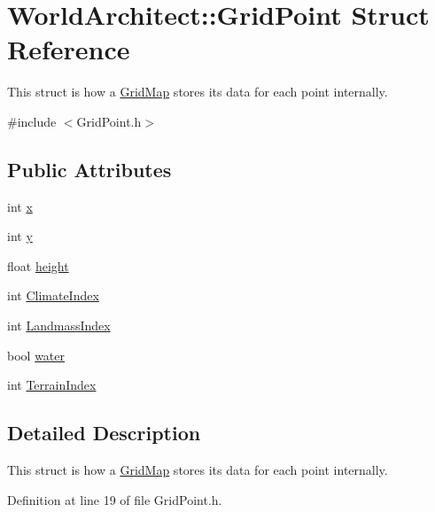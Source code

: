 \hypertarget{struct_world_architect_1_1_grid_point}{}\section{World\+Architect\+::Grid\+Point Struct Reference}
\label{struct_world_architect_1_1_grid_point}


This struct is how a \mbox{\hyperlink{class_world_architect_1_1_grid_map}{Grid\+Map}} stores its data for each point internally.  




{\ttfamily \#include $<$Grid\+Point.\+h$>$}

\subsection*{Public Attributes}
\begin{DoxyCompactItemize}
\item 
int \mbox{\hyperlink{struct_world_architect_1_1_grid_point_ada88aac3eb3984eb99233307389cec5a}{x}}
\item 
int \mbox{\hyperlink{struct_world_architect_1_1_grid_point_ad480b995c52c8369ddda4120961bafb7}{y}}
\item 
float \mbox{\hyperlink{struct_world_architect_1_1_grid_point_a77ef50260990da2fd6d30ba195c083ea}{height}}
\item 
int \mbox{\hyperlink{struct_world_architect_1_1_grid_point_a8443f35262aaa1ecfd26f0cab61f0229}{Climate\+Index}}
\item 
int \mbox{\hyperlink{struct_world_architect_1_1_grid_point_a9a28c9de1005d9f9f5930acc0facd998}{Landmass\+Index}}
\item 
bool \mbox{\hyperlink{struct_world_architect_1_1_grid_point_a275037537ff14db7e6eac5f0f94daae6}{water}}
\item 
int \mbox{\hyperlink{struct_world_architect_1_1_grid_point_a48ac8120c1a8a159c5f664d03e0eba51}{Terrain\+Index}}
\end{DoxyCompactItemize}


\subsection{Detailed Description}
This struct is how a \mbox{\hyperlink{class_world_architect_1_1_grid_map}{Grid\+Map}} stores its data for each point internally. 

Definition at line 19 of file Grid\+Point.\+h.



